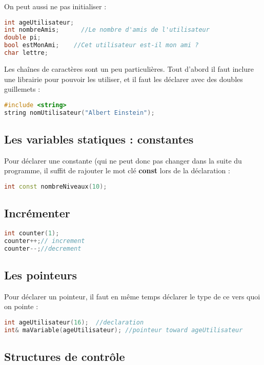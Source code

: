 \documentclass[a4paper,twoside]{article}
\begin{document}
On peut aussi ne pas initialiser :
\begin{lstlisting}[language=C++]
int ageUtilisateur;
int nombreAmis;      //Le nombre d'amis de l'utilisateur
double pi;
bool estMonAmi;    //Cet utilisateur est-il mon ami ?
char lettre;
\end{lstlisting}

\bigskip

Les chaînes de caractères sont un peu particulières. Tout d'abord il faut inclure une librairie pour pouvoir les utiliser, et 
il faut les déclarer avec des doubles guillemets : 
\begin{lstlisting}[language=C++]
#include <string>
string nomUtilisateur("Albert Einstein");
\end{lstlisting}

\subsection{Les variables statiques : constantes}

Pour déclarer une constante (qui ne peut donc pas changer dans la suite du programme, il suffit de rajouter le mot clé 
\textbf{const} lors de la déclaration :
\begin{lstlisting}[language=C++]
int const nombreNiveaux(10);
\end{lstlisting}

\subsection{Incrémenter}
\begin{lstlisting}[language=C++]
int counter(1);
counter++;// increment
counter--;//decrement
\end{lstlisting}

\subsection{Les pointeurs}
Pour déclarer un pointeur, il faut en même temps déclarer le type de ce vers quoi on pointe : 
\begin{lstlisting}[language=C++]
int ageUtilisateur(16);  //declaration
int& maVariable(ageUtilisateur); //pointeur toward ageUtilisateur
\end{lstlisting}

\subsection{Structures de contrôle}
\end{document}
